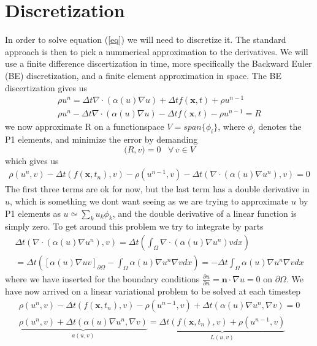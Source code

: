 \documentclass[a4paper,english, 10pt, twoside]{article}
\renewcommand{\d}{\partial}
\begin{document}
\section{Discretization}\label{discretization}
In order to solve equation (\ref{eq}) we will need to discretize it. The standard approach is then to pick a nummerical approximation to the 
derivatives. We will use a finite difference discertization in time, more specifically the Backward Euler (BE) discretization, and a finite element 
approximation in space. The BE discertization gives us
\begin{align*}
 \rho u^n = \Delta t\nabla\cdot(\alpha(u)\nabla u) +\Delta t f(\mathbf{x},t) +\rho u^{n-1} \\
 \rho u^n - \Delta t\nabla\cdot(\alpha(u)\nabla u) -\Delta t f(\mathbf{x},t) -\rho u^{n-1} = R
\end{align*}
we now approximate R on a functionspace $V = span\{\phi_i\}$, where $\phi_i$ denotes the P1 elements, and minimize the error by demanding
$$
\big(R,v\big) = 0 \;\;\; \forall \,v\in V
$$
which gives us 
\begin{align*}
  \rho (u^n,v)  -\Delta t (f(\mathbf{x},t_n),v) -\rho (u^{n-1},v) - \Delta t(\nabla\cdot(\alpha(u)\nabla u^n),v)= 0 
\end{align*}
The first three terms are ok for now, but the last term has a double derivative in $u$, which is something we dont want seeing as we are trying to 
approximate $u$ by P1 elements as $u \simeq \sum\limits_{k}u_k\phi_k$, and the double derivative of a linear function is simply zero. To get around 
this problem we try to integrate by parts
\begin{align*}
 \Delta t(\nabla\cdot(\alpha(u)\nabla u^n),v) = \Delta t\left(\int_\Omega \nabla\cdot(\alpha(u)\nabla u^n)vdx\right)\\
 =\Delta t \left(\left[\alpha(u)\nabla u v\right]_{\d \Omega}-\int_\Omega \alpha(u)\nabla u^n\nabla vdx\right) = -\Delta t\int_\Omega 
 \alpha(u)\nabla u^n\nabla vdx
\end{align*}
where we have inserted for the boundary conditions $\frac{\d u}{\d n} = \mathbf{n}\cdot\nabla u = 0$ on $\d\Omega$. We have now arrived on a 
linear variational problem to be solved at each timestep
\begin{align*}
  \rho (u^n,v)  -\Delta t (f(\mathbf{x},t_n),v) -\rho (u^{n-1},v) + \Delta t(\alpha(u)\nabla u^n,\nabla v)= 0  \\
   \underbrace{\rho (u^n,v)   + \Delta t(\alpha(u)\nabla u^n,\nabla v)}_{a(u,v)}=  \underbrace{\Delta t (f(\mathbf{x},t_n),v) +\rho 
   (u^{n-1},v)}_{L(u,v)}
\end{align*}
\end{document}
